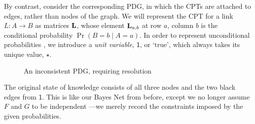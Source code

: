 \documentclass{article}
\newcommand{\MN}{PDG}
\begin{document}
\begin{example}
		By contrast, consider the corresponding \MN,
		in which the CPTs are attached to edges, rather than nodes of the graph. 
		We will represent the CPT for a link $L \!\colon\! A\!\to\! B$ as matrices $\mathbf L$, whose element $\mathbf L_{a,b}$ at row $a$, column $b$ is the conditional probability $\Pr(B \!\!=\!\!b \mid A \!\!=\!\! a)$. 		
		In order to represent unconditional probabilities%
		, we introduce a \emph{unit variable}, $\mathsf 1$, or `$\mathrm{true}$', which always takes its unique value, $\star$. 
		
		\begin{figure}[h]
			\centering
			\caption{An inconsistent \MN, requiring resolution}
			\label{fig:gun-floomp-diagram}
		\end{figure}
		
		The original state of knowledge consists of all three nodes and the two black edges from $\mathsf 1$. This is like our Bayes Net from before, except we no longer assume $F$ and $G$ to be independent%
		---we merely record the constraints imposed by the given probabilities.
	

\end{example}
\end{document}
